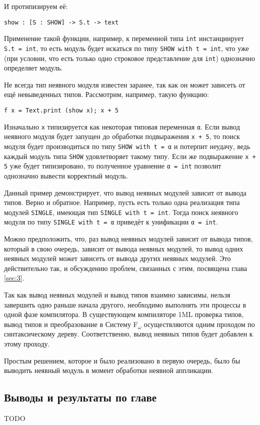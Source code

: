 \documentclass[../diploma.tex]{subfiles}
\begin{document}
И протипизируем её:

\begin{verbatim}
show : [S : SHOW] -> S.t -> text
\end{verbatim}

Применение такой функции, например, к переменной типа \texttt{int} инстанциирует \\\texttt{S.t = int}, то есть модуль будет искаться по типу \texttt{SHOW with t = int}, что уже (при условии, что есть только одно строковое представление для \texttt{int}) однозначно определяет модуль.

Не всегда тип неявного модуля известен заранее, так как он может зависеть от ещё невыведенных типов. Рассмотрим, например, такую функцию:

\begin{verbatim}
f x = Text.print (show x); x + 5
\end{verbatim}

Изначально \texttt{x} типизируется как некоторая типовая переменная \texttt{α}. Если вывод неявного модуля будет запущен до обработки подвыражения \texttt{x + 5}, то поиск модуля будет производиться по типу \texttt{SHOW with t = α} и потерпит неудачу, ведь каждый модуль типа \texttt{SHOW} удовлетворяет такому типу. Если же подвыражение \texttt{x + 5} уже будет типизировано, то полученное уравнение \texttt{α = int} позволит однозначно вывести корректный модуль.

Данный пример демонстрирует, что вывод неявных модулей зависит от вывода типов. Верно и обратное. Например, пусть есть только одна реализация типа модулей \texttt{SINGLE}, имеющая тип \texttt{SINGLE with t = int}. Тогда поиск неявного модуля по типу \texttt{SINGLE with t = α} приведёт к унификации \texttt{α = int}.

Можно предположить, что, раз вывод неявных модулей зависит от вывода типов, который в свою очередь, зависит от вывода неявных модулей, то вывод одних неявных модулей может зависеть от вывода других неявных модулей. Это действительно так, и обсуждению проблем, связанных с этим, посвящена глава \ref{sec:3}.

Так как вывод неявных модулей и вывод типов взаимно зависимы, нельзя завершить одно раньше начала другого, необходимо выполнять эти процессы в одной фазе компилятора. В существующем компиляторе 1ML проверка типов, вывод типов и преобразование в Систему F\textsubscript{$\omega$} осуществляются одним проходом по синтаксическому дереву. Соответственно, вывод неявных типов будет добавлен к этому проходу.

Простым решением, которое и было реализовано в первую очередь, было бы выводить неявный модуль в момент обработки неявной аппликации. 

\subsection{Выводы и результаты по главе}

TODO
\end{document}
